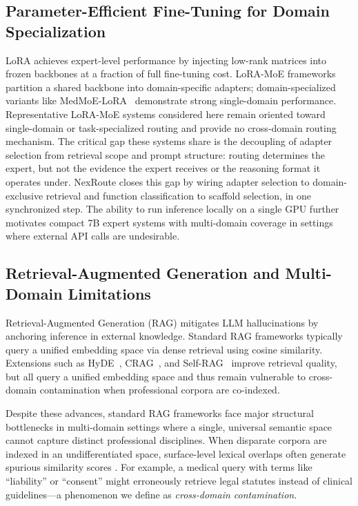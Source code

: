 \documentclass[a4paper,fleql,doubleblind]{cas-sc}
\begin{document}
\subsection{Parameter-Efficient Fine-Tuning for Domain Specialization}
LoRA \citep{hu2022lora} achieves expert-level performance by injecting low-rank
matrices into frozen backbones at a fraction of full fine-tuning cost.
LoRA-MoE frameworks~\citep{dou2024loramoe,wu2024mixtureofloras} partition a
shared backbone into domain-specific adapters; domain-specialized variants like
MedMoE-LoRA~\citep{yang2025medmoelora} demonstrate strong single-domain performance.
Representative LoRA-MoE systems considered here remain oriented toward single-domain
or task-specialized routing and provide no cross-domain routing mechanism.
The critical gap these systems share is the decoupling of adapter selection from
retrieval scope and prompt structure: routing determines the expert, but not the
evidence the expert receives or the reasoning format it operates under.
NexRoute closes this gap by wiring adapter selection to domain-exclusive retrieval
and function classification to scaffold selection, in one synchronized step.
The ability to run inference locally on a single GPU further motivates compact 7B
expert systems with multi-domain coverage in settings where external API calls
are undesirable.

\subsection{Retrieval-Augmented Generation and Multi-Domain Limitations}
Retrieval-Augmented Generation (RAG) \citep{lewis2020rag} mitigates LLM hallucinations by anchoring inference in external knowledge. Standard RAG frameworks typically query a unified embedding space via dense retrieval \citep{karpukhin2020dense} using cosine similarity. Extensions such as HyDE~\citep{gao2023hyde}, CRAG~\citep{yan2024crag}, and
Self-RAG~\citep{asai2023selfrag} improve retrieval quality, but all query a
unified embedding space and thus remain vulnerable to cross-domain contamination
when professional corpora are co-indexed.

Despite these advances, standard RAG frameworks face major structural bottlenecks in multi-domain settings where a single, universal semantic space cannot capture distinct professional disciplines. When disparate corpora are indexed in an undifferentiated space, surface-level lexical overlaps often generate spurious similarity scores \citep{wang2024multilingual}. For example, a medical query with terms like ``liability'' or ``consent'' might erroneously retrieve legal statutes instead of clinical guidelines—a phenomenon we define as \emph{cross-domain contamination}.
\end{document}
